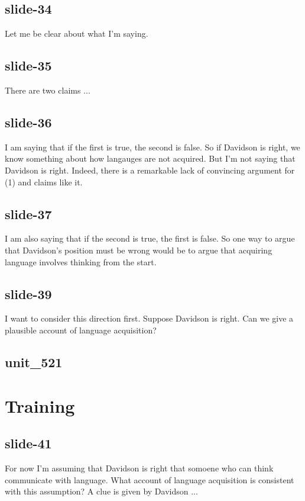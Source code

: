 \documentclass[12pt,\papersize]{extarticle}
\begin{document}
 
\subsection{slide-34}
Let me be clear about what I'm saying.
 
 
\subsection{slide-35}
There are two claims ...
 
 
\subsection{slide-36}
I am saying that if the first is true, the second is false.
So if Davidson is right, we know something about how langauges are not acquired.
But I'm not saying that Davidson is right.
Indeed, there is a remarkable lack of convincing argument for (1) and claims like it.
 
 
\subsection{slide-37}
I am also saying that if the second is true, the first is false.
So one way to argue that Davidson's position must be wrong would be to argue that acquiring language involves thinking from the start.
 
 
\subsection{slide-39}
I want to consider this direction first.
Suppose Davidson is right. Can we give a plausible account of language acquisition?
 
 
\subsection{unit\_521}
 
\section{Training}
 
 
\subsection{slide-41}
For now I'm assuming that Davidson is right that somoene who can think communicate with language.
What account of language acquisition is consistent with this assumption?
A clue is given by Davidson ...
 
\end{document}
